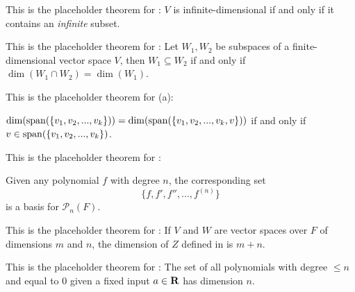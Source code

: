 \begin{additional theorem} \label{athm 1.21}
This is the placeholder theorem for : \(V\) is infinite-dimensional if and only if it contains an \emph{infinite} \LID{} subset.
\end{additional theorem}

\begin{additional theorem} \label{athm 1.22}
This is the placeholder theorem for : Let \(W_1, W_2\) be subspaces of a finite-dimensional vector space \(V\), then \(W_1 \subseteq W_2\) if and only if \(\dim(W_1 \cap W_2) = \dim(W_1)\).
\end{additional theorem}

\begin{additional theorem} \label{athm 1.23}
This is the placeholder theorem for (a):

\(\dim(\operatorname{span}(\{ v_1, v_2, ..., v_k \})) = \dim(\operatorname{span}(\{ v_1, v_2, ..., v_k, v \}))\) if and only if \(v \in \operatorname{span}(\{ v_1, v_2, ..., v_k \})\).
\end{additional theorem}

\begin{additional theorem} \label{athm 1.24}
This is the placeholder theorem for :

Given any polynomial \(f\) with degree \(n\), the corresponding set
\[
    \{ f, f', f'', ..., f^{(n)} \}
\]
is a basis for \(\mathcal{P}_n(F)\).
\end{additional theorem}

\begin{additional theorem} \label{athm 1.25}
This is the placeholder theorem for :
If \(V\) and \(W\) are vector spaces over \(F\) of dimensions \(m\) and \(n\), the dimension of \(Z\) defined in  is \(m + n\).
\end{additional theorem}

\begin{additional theorem} \label{athm 1.26}
This is the placeholder theorem for :
The set of all polynomials with degree \(\le n\) and equal to \(0\) given a fixed input \(a \in \mathbf{R}\) has dimension \(n\).
\end{additional theorem}

